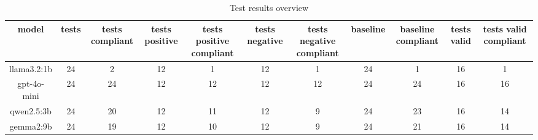 
  \begin{table}[h!]
  \centering
  \begin{tabular}{|c|c|c|c|c|c|c|c|c|c|c|}
  \hline
  model & tests & tests compliant & tests positive & tests positive compliant & tests negative & tests negative compliant & baseline & baseline compliant & tests valid & tests valid compliant \\
  \hline
  llama3.2:1b & 24 & 2 & 12 & 1 & 12 & 1 & 24 & 1 & 16 & 1\\
\hline
gpt-4o-mini & 24 & 24 & 12 & 12 & 12 & 12 & 24 & 24 & 16 & 16\\
\hline
qwen2.5:3b & 24 & 20 & 12 & 11 & 12 & 9 & 24 & 23 & 16 & 14\\
\hline
gemma2:9b & 24 & 19 & 12 & 10 & 12 & 9 & 24 & 21 & 16 & 14
  \end{tabular}
  \caption{Test results overview}
  
  \end{table}
  